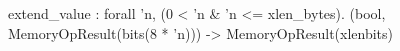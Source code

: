 extend_value : forall 'n, (0 < 'n & 'n <= xlen_bytes). (bool, MemoryOpResult(bits(8 * 'n))) -> MemoryOpResult(xlenbits)